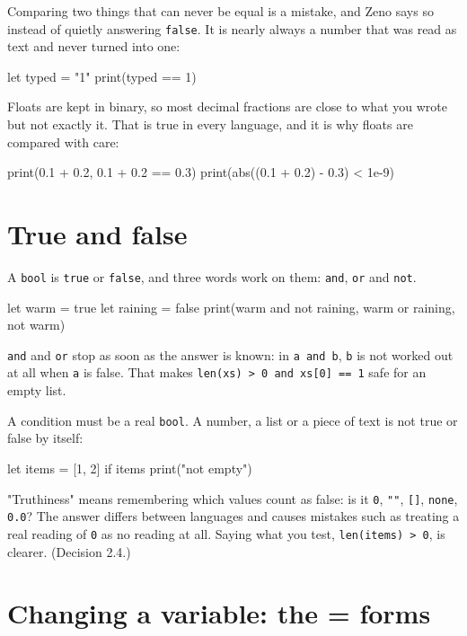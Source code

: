 Comparing two things that can never be equal is a mistake, and Zeno
says so instead of quietly answering \verb|false|. It is nearly always
a number that was read as text and never turned into one:

\begin{zeno}[fails=yes]
let typed = "1"
print(typed == 1)
\end{zeno}

Floats are kept in binary, so most decimal fractions are close to
what you wrote but not exactly it. That is true in every language, and
it is why floats are compared with care:

\begin{zeno}
print(0.1 + 0.2, 0.1 + 0.2 == 0.3)
print(abs((0.1 + 0.2) - 0.3) < 1e-9)
\end{zeno}

\section{True and false}

A \verb|bool| is \verb|true| or \verb|false|, and three words work on
them: \verb|and|, \verb|or| and \verb|not|.

\begin{zeno}
let warm = true
let raining = false
print(warm and not raining, warm or raining, not warm)
\end{zeno}

\verb|and| and \verb|or| stop as soon as the answer is known: in
\verb|a and b|, \verb|b| is not worked out at all when \verb|a| is
false. That makes \verb|len(xs) > 0 and xs[0] == 1| safe for an empty
list.

A condition must be a real \verb|bool|. A number, a list or a piece of
text is not true or false by itself:

\begin{zeno}[fails=yes]
let items = [1, 2]
if items {
    print("not empty")
}
\end{zeno}

\begin{why}
"Truthiness" means remembering which values count as false: is it
\verb|0|, \verb|""|, \verb|[]|, \verb|none|, \verb|0.0|? The answer
differs between languages and causes mistakes such as treating a real
reading of \verb|0| as no reading at all. Saying what you test,
\verb|len(items) > 0|, is clearer. (Decision 2.4.)
\end{why}

\section{Changing a variable: the = forms}


